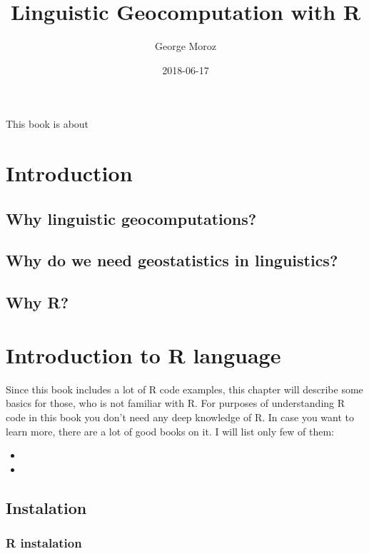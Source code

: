\documentclass[]{book}
\title{Linguistic Geocomputation with R}
\author{George Moroz}
\date{2018-06-17}
\theoremstyle{definition}
\theoremstyle{definition}
\theoremstyle{definition}
\theoremstyle{remark}
\begin{document}
\maketitle

{
\setcounter{tocdepth}{1}
\tableofcontents
}
This book is about

\chapter{Introduction}\label{intro}

\section{Why linguistic
geocomputations?}\label{why-linguistic-geocomputations}

\section{Why do we need geostatistics in
linguistics?}\label{why-do-we-need-geostatistics-in-linguistics}

\section{Why R?}\label{why-r}

\chapter{Introduction to R language}\label{introduction-to-r-language}

Since this book includes a lot of R code examples, this chapter will
describe some basics for those, who is not familiar with R. For purposes
of understanding R code in this book you don't need any deep knowledge
of R. In case you want to learn more, there are a lot of good books on
it. I will list only few of them:

\begin{itemize}
\item
\item
\end{itemize}

\section{Instalation}\label{instalation}

\subsection{R instalation}\label{r-instalation}
\end{document}
